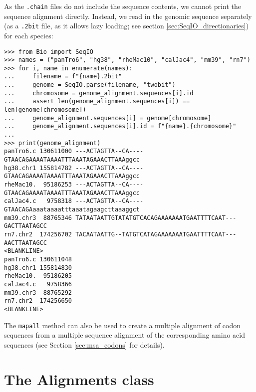 As the \verb+.chain+ files do not include the sequence contents, we cannot print the sequence alignment directly. Instead, we read in the genomic sequence separately (as a \verb+.2bit+ file, as it allows lazy loading; see section \ref{sec:SeqIO_directionaries}) for each species:
\begin{verbatim}
>>> from Bio import SeqIO
>>> names = ("panTro6", "hg38", "rheMac10", "calJac4", "mm39", "rn7")
>>> for i, name in enumerate(names):
...     filename = f"{name}.2bit"
...     genome = SeqIO.parse(filename, "twobit")
...     chromosome = genome_alignment.sequences[i].id
...     assert len(genome_alignment.sequences[i]) == len(genome[chromosome])
...     genome_alignment.sequences[i] = genome[chromosome]
...     genome_alignment.sequences[i].id = f"{name}.{chromosome}"
...
>>> print(genome_alignment)
panTro6.c 130611000 ---ACTAGTTA--CA----GTAACAGAAAATAAAATTTAAATAGAAACTTAAAggcc
hg38.chr1 155814782 ---ACTAGTTA--CA----GTAACAGAAAATAAAATTTAAATAGAAACTTAAAggcc
rheMac10.  95186253 ---ACTAGTTA--CA----GTAACAGAAAATAAAATTTAAATAGAAACTTAAAggcc
calJac4.c   9758318 ---ACTAGTTA--CA----GTAACAGAaaataaaatttaaatagaagcttaaaggct
mm39.chr3  88765346 TATAATAATTGTATATGTCACAGAAAAAAATGAATTTTCAAT---GACTTAATAGCC
rn7.chr2  174256702 TACAATAATTG--TATGTCATAGAAAAAAATGAATTTTCAAT---AACTTAATAGCC
<BLANKLINE>
panTro6.c 130611048
hg38.chr1 155814830
rheMac10.  95186205
calJac4.c   9758366
mm39.chr3  88765292
rn7.chr2  174256650
<BLANKLINE>
\end{verbatim}
The \verb+mapall+ method can also be used to create a multiple alignment of codon sequences from a multiple sequence alignment of the corresponding amino acid sequences (see Section \ref{sec:msa_codons} for details).

\section{The Alignments class}
\label{sec:alignments}

